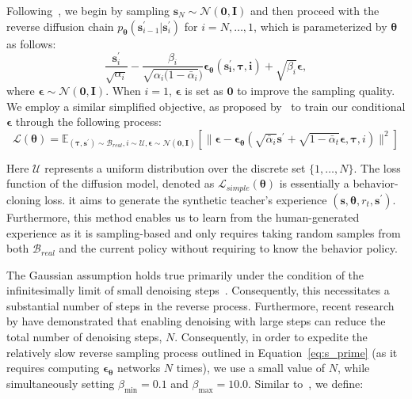 \documentclass{article}
\newcommand\mI{\bm{I}}
\newcommand\vs{\bm{s}}
\begin{document}
Following~\citet{wang2022diffusion}, we begin by sampling $\vs_N \sim \mathcal{N}(\bm{0},\mI) $ and then proceed with the reverse diffusion chain $p_{\bm{\theta}}(\vs_{i-1}^\prime | \vs_i^\prime)$ for $i=N,\dots, 1$, which is parameterized by $\bm{\theta}$ as follows:
\begin{equation}
    \frac{\vs_i^\prime}{\sqrt{\alpha_i}} - \frac{\beta_i}{\sqrt{\alpha_i(1-\bar{\alpha}_i})}\bm{\epsilon_{\bm{\theta}}(\vs_i^\prime,\tau,i)} + \sqrt{\beta_i}\bm{\epsilon},
\end{equation}\label{eq:s_prime}
where $\bm{\epsilon}\sim \mathcal{N}(\bm{0},\mI)$. When $i = 1$, $\bm{\epsilon}$ is set as $\bm{0}$ to improve the sampling quality. 
We employ a similar simplified objective, as proposed by~\citet{ho2020denoising} to train our conditional $\bm{\epsilon}$ through the following process:
\begin{equation}
        \mathcal{L}(\bm{\theta}) = \mathbb{E}_{(\bm{\tau}, \vs^\prime )\sim \bm{\mathcal{B}}_{real},i \sim \mathcal{U},\bm{\epsilon} \sim \mathcal{N}(\bm{0},\mI) } \left[ \lVert \bm{\epsilon}  - \bm{\epsilon}_{\bm{\theta}}(\sqrt{\bar{\alpha}_i}\vs^\prime + \sqrt{1-\bar{\alpha}_t }\bm{\epsilon},\bm{\tau},i)  \rVert^2  \right]
\end{equation}

Here $\mathcal{U}$ represents a uniform distribution over the discrete set $\{1,\dots, N\}$. The loss function of the diffusion model, denoted as $\mathcal{L}_{simple}(\bm{\theta})$ is essentially a behavior-cloning loss. it aims to generate the synthetic teacher's experience $(\vs,\bm{\theta}, r_t,\vs^\prime)$. Furthermore, this method enables us to learn from the human-generated experience as it is sampling-based and only requires taking random samples from both $\bm{\mathcal{B}}_{real}$ and the current policy without requiring to know the behavior policy. 


The Gaussian assumption holds true primarily under the condition of the infinitesimally limit of small denoising steps~\citep{sohl2015deep}. Consequently, this necessitates a substantial number of steps in the reverse process.
Furthermore, recent research by\citet{xiao2021tackling} have demonstrated that enabling denoising with large steps can reduce the total number of denoising steps, $N$. Consequently, in order to expedite the relatively slow reverse sampling process outlined in Equation~\ref{eq:s_prime} (as it requires computing $\bm{\epsilon}_{\bm{\theta}}$ networks $N$ times), we use a small value of $N $, while simultaneously setting $\beta_{\min} = 0.1$ and $\beta_{\max} = 10.0$. Similar to~\citet{wang2022diffusion}, we define:
\end{document}
